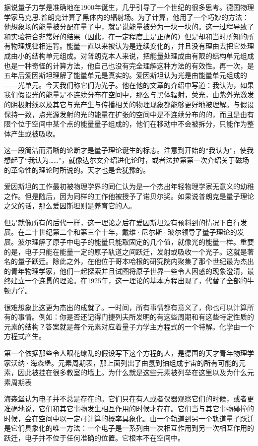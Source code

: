   据说量子力学是准确地在1900年诞生，几乎引导了一个世纪的很多思考。德国物理学家马克思.普朗克计算了黑体内的辐射场。为了计算，他用了一个巧妙的方法：他想象场的能量被分配在量子中，就是说能量被分为一块一块的。这一过程导致了和实验符合非常好的结果（因此，在一定程度上是正确的）但是却和当时所知的所有物理规律相违背。能量一直以来被认为是连续变化的，并且没有理由去把它处理成由小的结构单元组成。对普朗克本人来说，把能量处理成由有限的结构单元组成也是一种奇怪的计算方法，他自己也没有完全理解这种方法的有效性。再一次，是五年后爱因斯坦理解了能量单元是真实的。爱因斯坦认为光是由能量单元组成的——光单元。今天我们称它们为光子。他在他的文章的介绍中写道：我认为，如果我们假设光的能量是不连续分布在空间中，那么与黑体辐射，荧光，由紫外光激发的阴极射线以及其它与光产生与传播相关的物理现象都能够更好地被理解。与假设保持一致，点光源发射的光的能量在扩张的空间中是不连续分布的的，而且是由有限个位于空间中某个点的能量量子组成的，他们在移动中不会被拆分，只能作为整体产生或被吸收。

  这一段简洁而清晰的论断才是量子理论诞生的标志。注意到开始的“我认为”，使我想起了“我认为……”，就像达尔文介绍进化论时，或者法拉第第一次介绍关于磁场的革命性的理论时所说的。天才也是会犹豫的。

  爱因斯坦的工作最初被物理学界的同仁认为是一个杰出年轻物理学家无意义的幼稚之作。但是随后，因为同样的工作他被授予了诺贝尔奖。如果说普朗克是量子理论之父的话，那么爱因斯坦则是养育它的人。

  但是就像所有的后代一样，这一理论之后在爱因斯坦没有预料到的情况下自行发展。在二十世纪第二个和第三个十年，戴维·尼尔斯·玻尔领导了量子理论的发展。波尔理解了原子中电子的能量只能取固定的几个值，就像光的能量一样。重要的是，电子只能在能量一定的原子轨道之间跃迁，发射或吸收一个光子。这就是著名的量子跃迁。除此之外，在他位于哥本哈根的研究院内聚集了那个世纪最为杰出的青年物理学家，他们一起探索并且试图将原子世界一些令人困惑的现象澄清，最终建立一个连贯的理论。在1925年，这一理论的基本方程出现了，代替了全部的牛顿力学。

  很难想象比这更为杰出的成就了。一时间，所有事情都有意义了，你也可以计算所有的事情。例如：你是否还记得门捷列夫所发明的有这些周期和有这些特定性质的元素的结构？答案就是每个元素对应着量子力学主方程式的一个特解。化学由一个方程式产生。

  第一个依据那些令人眼花缭乱的假设写下这个方程的人，是德国的天才青年物理学家沃纳·海森堡。元素周期表，那上面列出了由氢到铀组成宇宙的所有可能的元素，因此被挂在很多教室的墙上。为什么就是这些元素被列举在这里以及为什么元素周期表

  海森堡认为电子并不总是存在的。它们只在有人或者仪器观察它们的时候，或者更准确地说，它们和其它事物发生相互作用的时候才存在。它们当与其它事物碰撞的时候，会在空间中以一定可计算的概率具象化。由一个轨道到另一个轨道量子跃迁是它们具象化的唯一方法：一个电子是一系列由一次相互作用到另一次相互作用的跃迁，电子并不位于任何准确的位置。它根本不在空间中。

